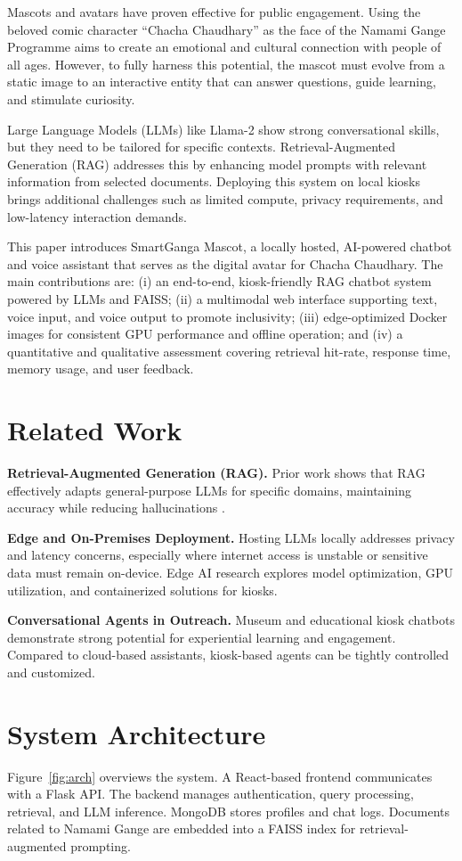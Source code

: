 \documentclass[conference]{IEEEtran}
\begin{document}
Mascots and avatars have proven effective for public engagement. Using the beloved comic character ``Chacha Chaudhary'' as the face of the Namami Gange Programme aims to create an emotional and cultural connection with people of all ages. However, to fully harness this potential, the mascot must evolve from a static image to an interactive entity that can answer questions, guide learning, and stimulate curiosity.

Large Language Models (LLMs) like Llama-2 show strong conversational skills, but they need to be tailored for specific contexts. Retrieval-Augmented Generation (RAG) addresses this by enhancing model prompts with relevant information from selected documents. Deploying this system on local kiosks brings additional challenges such as limited compute, privacy requirements, and low-latency interaction demands.

This paper introduces SmartGanga Mascot, a locally hosted, AI-powered chatbot and voice assistant that serves as the digital avatar for Chacha Chaudhary. The main contributions are: (i) an end-to-end, kiosk-friendly RAG chatbot system powered by LLMs and FAISS; (ii) a multimodal web interface supporting text, voice input, and voice output to promote inclusivity; (iii) edge-optimized Docker images for consistent GPU performance and offline operation; and (iv) a quantitative and qualitative assessment covering retrieval hit-rate, response time, memory usage, and user feedback.

\section{Related Work}
\textbf{Retrieval-Augmented Generation (RAG).} Prior work shows that RAG effectively adapts general-purpose LLMs for specific domains, maintaining accuracy while reducing hallucinations \cite{rag_lewis2020}.

\textbf{Edge and On-Premises Deployment.} Hosting LLMs locally addresses privacy and latency concerns, especially where internet access is unstable or sensitive data must remain on-device. Edge AI research explores model optimization, GPU utilization, and containerized solutions for kiosks.

\textbf{Conversational Agents in Outreach.} Museum and educational kiosk chatbots demonstrate strong potential for experiential learning and engagement. Compared to cloud-based assistants, kiosk-based agents can be tightly controlled and customized.

\section{System Architecture}
Figure~\ref{fig:arch} overviews the system. A React-based frontend communicates with a Flask API. The backend manages authentication, query processing, retrieval, and LLM inference. MongoDB stores profiles and chat logs. Documents related to Namami Gange are embedded into a FAISS index for retrieval-augmented prompting.
\end{document}
